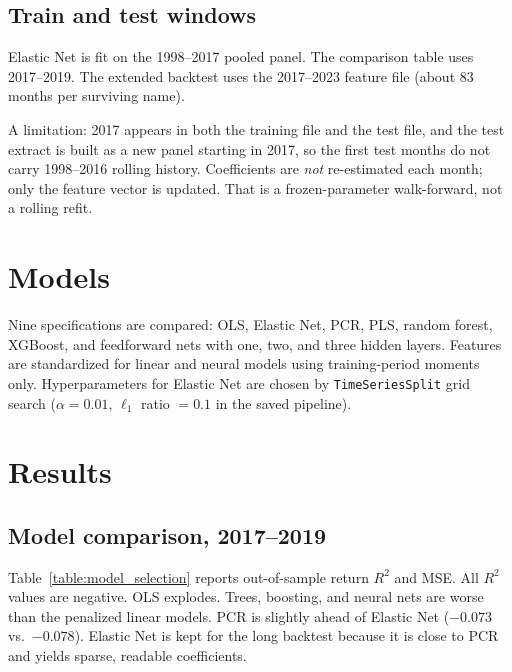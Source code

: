 \documentclass[11pt,twocolumn]{article}
\begin{document}
\subsection{Train and test windows}

Elastic Net is fit on the 1998--2017 pooled panel. The comparison table uses 2017--2019. The extended backtest uses the 2017--2023 feature file (about 83 months per surviving name).

A limitation: 2017 appears in both the training file and the test file, and the test extract is built as a new panel starting in 2017, so the first test months do not carry 1998--2016 rolling history. Coefficients are \emph{not} re-estimated each month; only the feature vector is updated. That is a frozen-parameter walk-forward, not a rolling refit.

\section{Models}

Nine specifications are compared: OLS, Elastic Net, PCR, PLS, random forest, XGBoost, and feedforward nets with one, two, and three hidden layers. Features are standardized for linear and neural models using training-period moments only. Hyperparameters for Elastic Net are chosen by \texttt{TimeSeriesSplit} grid search ($\alpha=0.01$, $\ell_1$ ratio $=0.1$ in the saved pipeline).

\section{Results}

\subsection{Model comparison, 2017--2019}

Table~\ref{table:model_selection} reports out-of-sample return $R^2$ and MSE. All $R^2$ values are negative. OLS explodes. Trees, boosting, and neural nets are worse than the penalized linear models. PCR is slightly ahead of Elastic Net ($-0.073$ vs.\ $-0.078$). Elastic Net is kept for the long backtest because it is close to PCR and yields sparse, readable coefficients.
\end{document}
